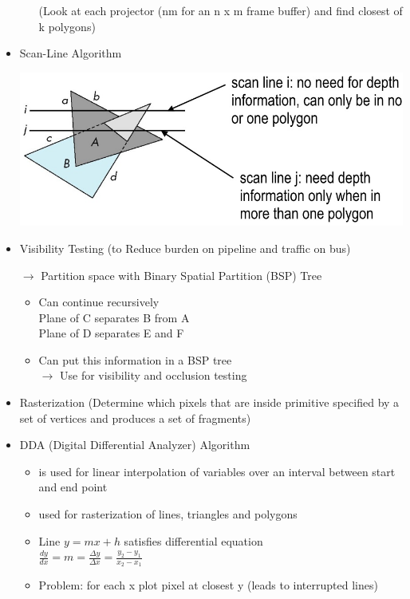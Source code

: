 \documentclass[11pt,a4paper]{article}
\begin{document}
\begin{itemize}
\begin{itemize}
					(Look at each projector (nm for an n x m frame buffer) and find closest of k polygons)
				\end{itemize}
			\item Scan-Line Algorithm
			\begin{center}
				\includegraphics[scale=0.4]{pictures/ScanLineAlgorithm.jpg}
			\end{center}
			\item Visibility Testing (to Reduce burden on pipeline and traffic on bus)
			\item[$\rightarrow$] Partition space with Binary Spatial Partition (BSP) Tree
				\begin{itemize}
					\item Can continue recursively\\
					Plane of C separates B from A\\
					Plane of D separates E and F
					\item Can put this information in a BSP tree\\
					$\rightarrow$ Use for visibility and occlusion testing
				\end{itemize}
			\item Rasterization (Determine which pixels that are inside primitive specified by a set of vertices and produces a set of fragments)
			\item DDA (Digital Differential Analyzer) Algorithm
				\begin{itemize}
					\item is used for linear interpolation of variables over an interval between start and end point
					\item used for rasterization of lines, triangles and polygons
					\item Line $y=mx+h$ satisfies differential equation\\
					$\frac{dy}{dx}=m=\frac{\Delta y}{\Delta x}=\frac{y_2-y_1}{x_2-x_1}$
					\item Problem: for each x plot pixel at closest y (leads to interrupted lines)

\end{itemize}
\end{itemize}
\end{document}
